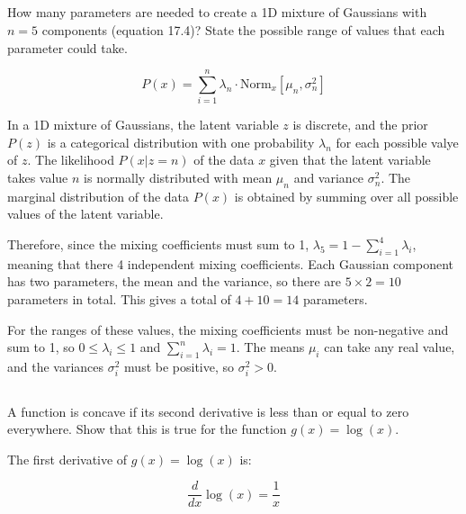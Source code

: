 \documentclass[12pt]{report}
\begin{document}
\subsection{}
\begin{mdframed}
    How many parameters are needed to create a 1D mixture of Gaussians with $n=5$ components (equation 17.4)? State the possible range of values that each parameter could take.

    \begin{equation*}
        P(x) = \sum_{i=1}^{n} \lambda_{n} \cdot \text{Norm}_{x}[\mu_{n}, \sigma_{n}^{2}]
        \label{eq:17.4}
        \tag{17.4}
    \end{equation*}
\end{mdframed}

In a 1D mixture of Gaussians, the latent variable $z$ is discrete, and the prior $P(z)$ is a categorical distribution with one probability $\lambda_n$ for each possible valye of $z$. The likelihood $P(x | z =n)$ of the data $x$ given that the latent variable takes value $n$ is normally distributed with mean $\mu_n$ and variance $\sigma_n^2$. The marginal distribution of the data $P(x)$ is obtained by summing over all possible values of the latent variable.

Therefore, since the mixing coefficients must sum to 1, $\lambda_5 = 1 - \sum_{i=1}^{4} \lambda_i$, meaning that there 4 independent mixing coefficients. Each Gaussian component has two parameters, the mean and the variance, so there are $5 \times 2 = 10$ parameters in total. This gives a total of $4+10 = 14$ parameters.

For the ranges of these values, the mixing coefficients must be non-negative and sum to 1, so $0 \leq \lambda_i \leq 1$ and $\sum_{i=1}^{n} \lambda_i = 1$. The means $\mu_i$ can take any real value, and the variances $\sigma_i^2$ must be positive, so $\sigma_i^2 > 0$.

\subsection{}
\begin{mdframed}
    A function is concave if its second derivative is less than or equal to zero everywhere. Show that this is true for the function $g(x) = \log(x)$.
\end{mdframed}

The first derivative of $g(x) = \log(x)$ is:

\begin{equation*}
    \frac{d}{dx} \log(x) = \frac{1}{x}
\end{equation*}
\end{document}
